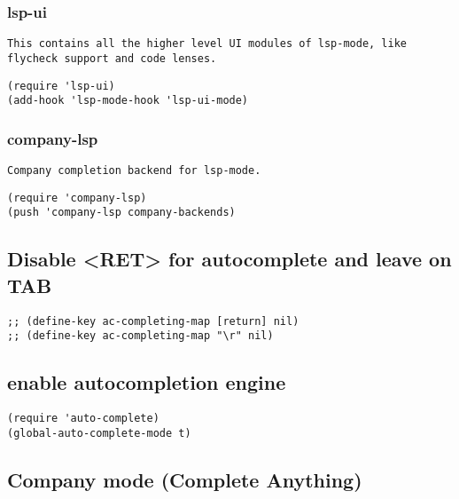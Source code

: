 \documentclass[11pt]{article}
\begin{document}
\subsubsection*{lsp-ui}
\label{sec:orga717767}

\begin{verbatim}
This contains all the higher level UI modules of lsp-mode, like flycheck support and code lenses.
\end{verbatim}


\begin{verbatim}
(require 'lsp-ui)
(add-hook 'lsp-mode-hook 'lsp-ui-mode)
\end{verbatim}

\subsubsection*{company-lsp}
\label{sec:org8f92314}

\begin{verbatim}
Company completion backend for lsp-mode. 
\end{verbatim}


\begin{verbatim}
(require 'company-lsp)
(push 'company-lsp company-backends)
\end{verbatim}

\subsection*{Disable <RET> for autocomplete and leave on TAB}
\label{sec:org3a50079}
\begin{verbatim}
;; (define-key ac-completing-map [return] nil)
;; (define-key ac-completing-map "\r" nil)
\end{verbatim}


\subsection*{enable autocompletion engine}
\label{sec:org770c1b3}
\begin{verbatim}
(require 'auto-complete)
(global-auto-complete-mode t)
\end{verbatim}


\subsection*{Company mode (Complete Anything)}
\label{sec:orge955e54}
\end{document}

